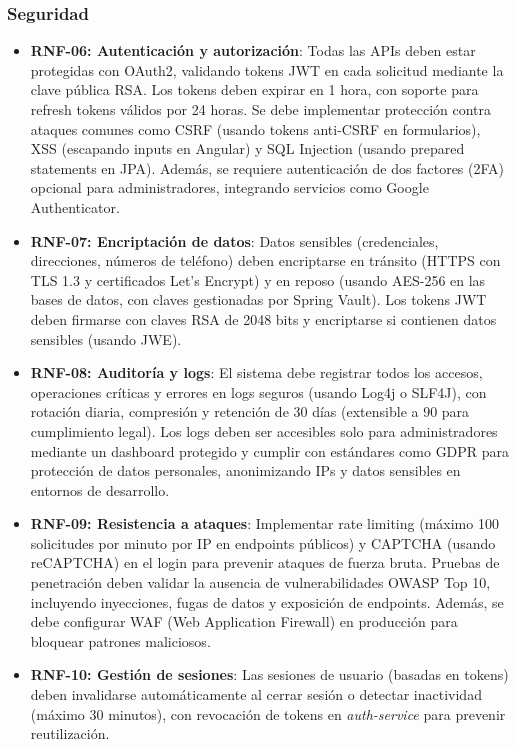 \documentclass[a4paper,12pt]{article}
\begin{document}
\subsubsection{Seguridad}
\begin{itemize}
    \item \textbf{RNF-06: Autenticación y autorización}: Todas las APIs deben estar protegidas con OAuth2, validando tokens JWT en cada solicitud mediante la clave pública RSA. Los tokens deben expirar en 1 hora, con soporte para refresh tokens válidos por 24 horas. Se debe implementar protección contra ataques comunes como CSRF (usando tokens anti-CSRF en formularios), XSS (escapando inputs en Angular) y SQL Injection (usando prepared statements en JPA). Además, se requiere autenticación de dos factores (2FA) opcional para administradores, integrando servicios como Google Authenticator.
    
    \item \textbf{RNF-07: Encriptación de datos}: Datos sensibles (credenciales, direcciones, números de teléfono) deben encriptarse en tránsito (HTTPS con TLS 1.3 y certificados Let's Encrypt) y en reposo (usando AES-256 en las bases de datos, con claves gestionadas por Spring Vault). Los tokens JWT deben firmarse con claves RSA de 2048 bits y encriptarse si contienen datos sensibles (usando JWE).
    
    \item \textbf{RNF-08: Auditoría y logs}: El sistema debe registrar todos los accesos, operaciones críticas y errores en logs seguros (usando Log4j o SLF4J), con rotación diaria, compresión y retención de 30 días (extensible a 90 para cumplimiento legal). Los logs deben ser accesibles solo para administradores mediante un dashboard protegido y cumplir con estándares como GDPR para protección de datos personales, anonimizando IPs y datos sensibles en entornos de desarrollo.
    
    \item \textbf{RNF-09: Resistencia a ataques}: Implementar rate limiting (máximo 100 solicitudes por minuto por IP en endpoints públicos) y CAPTCHA (usando reCAPTCHA) en el login para prevenir ataques de fuerza bruta. Pruebas de penetración deben validar la ausencia de vulnerabilidades OWASP Top 10, incluyendo inyecciones, fugas de datos y exposición de endpoints. Además, se debe configurar WAF (Web Application Firewall) en producción para bloquear patrones maliciosos.
    
    \item \textbf{RNF-10: Gestión de sesiones}: Las sesiones de usuario (basadas en tokens) deben invalidarse automáticamente al cerrar sesión o detectar inactividad (máximo 30 minutos), con revocación de tokens en \textit{auth-service} para prevenir reutilización.
\end{itemize}
\end{document}
